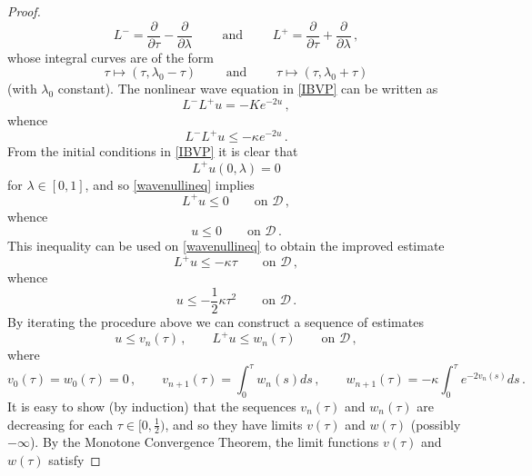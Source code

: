 \documentclass[10pt]{amsart}
\begin{document}
\begin{proof}
\begin{equation} \label{L+-}
L^- = \frac{\partial}{\partial \tau} - \frac{\partial}{\partial \lambda} \qquad \text{ and } \qquad L^+ = \frac{\partial}{\partial \tau} + \frac{\partial}{\partial \lambda} \, ,
\end{equation}
whose integral curves are of the form
\begin{equation}
\tau \mapsto (\tau, \lambda_0-\tau) \qquad \text{ and } \qquad \tau \mapsto (\tau, \lambda_0+\tau)
\end{equation}
(with $\lambda_0$ constant). The nonlinear wave equation in \eqref{IBVP} can be written as
\begin{equation} 
L^- L^+ u = - K e^{-2u} \, ,
\end{equation}
whence
\begin{equation} \label{wavenullineq}
L^- L^+ u \leq - \kappa e^{-2u} \, .
\end{equation}
From the initial conditions in \eqref{IBVP} it is clear that
\begin{equation}
L^+ u(0,\lambda) = 0
\end{equation}
for $\lambda \in [0,1]$, and so \eqref{wavenullineq} implies
\begin{equation}
L^+ u \leq 0 \qquad \text{on } \mathcal{D} \, ,
\end{equation}
whence
\begin{equation}
u \leq 0 \qquad \text{on } \mathcal{D} \, .
\end{equation}
This inequality can be used on \eqref{wavenullineq} to obtain the improved estimate
\begin{equation}
L^+ u \leq - \kappa \tau \qquad \text{on } \mathcal{D} \, ,
\end{equation}
whence
\begin{equation}
u \leq - \frac12 \kappa \tau^2 \qquad \text{on } \mathcal{D} \, .
\end{equation}
By iterating the procedure above we can construct a sequence of estimates
\begin{equation} \label{estimates}
u \leq v_n(\tau) \, , \qquad L^+ u \leq w_n(\tau) \qquad \text{on } \mathcal{D} \, ,
\end{equation}
where
\begin{equation}
v_0(\tau) = w_0(\tau) = 0 \, , \qquad v_{n+1}(\tau) = \int_0^\tau w_n(s) ds \, , \qquad w_{n+1}(\tau) = - \kappa \int_0^\tau e^{-2v_n(s)} ds \, .
\end{equation}
It is easy to show (by induction) that the sequences $v_n(\tau)$ and $w_n(\tau)$ are decreasing for each $\tau \in [0,\frac12)$, and so they have limits $v(\tau)$ and $w(\tau)$ (possibly $-\infty$). By the Monotone Convergence Theorem, the limit functions $v(\tau)$ and $w(\tau)$ satisfy

\end{proof}
\end{document}
